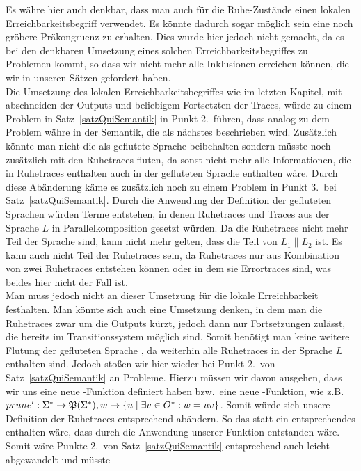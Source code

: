Es währe hier auch denkbar, dass man auch für die Ruhe-Zustände einen lokalen
Erreichbarkeitsbegriff verwendet. Es könnte dadurch sogar möglich sein eine
noch gröbere Präkongruenz zu erhalten. Dies wurde hier jedoch nicht gemacht, da
es bei den denkbaren Umsetzung eines solchen Erreichbarkeitsbegriffes zu
Problemen kommt, so dass wir nicht mehr alle Inklusionen erreichen können, die
wir in unseren Sätzen gefordert haben.\\
Die Umsetzung des lokalen Erreichbarkeitsbegriffes wie im letzten Kapitel, mit
abschneiden der Outputs und beliebigem Fortsetzten der Traces, würde zu einem
Problem in Satz~\ref{satzQuiSemantik} in Punkt 2.\ führen, dass analog zu dem
Problem währe in der Semantik, die als nächstes beschrieben wird. Zusätzlich könnte
man nicht die \EL{} als geflutete Sprache beibehalten sondern müsste noch
zusätzlich mit den Ruhetraces fluten, da sonst nicht mehr alle
Informationen, die in Ruhetraces enthalten auch in der gefluteten Sprache
enthalten wäre. Durch diese Abänderung käme es zusätzlich noch zu einem Problem
in Punkt 3.\ bei Satz~\ref{satzQuiSemantik}. Durch die Anwendung der Definition
der gefluteten Sprachen würden Terme entstehen, in denen Ruhetraces und Traces
aus der Sprache $L$ in Parallelkomposition gesetzt würden. Da die Ruhetraces
nicht mehr Teil der Sprache sind, kann nicht mehr gelten, dass die Teil von
$L_1\|L_2$ ist. Es kann auch nicht Teil der Ruhetraces sein, da Ruhetraces nur
aus Kombination von zwei Ruhetraces entstehen können oder in dem sie
Errortraces sind, was beides hier nicht der Fall ist.\\
Man muss jedoch nicht an dieser Umsetzung für die lokale Erreichbarkeit
festhalten. Man könnte sich auch eine Umsetzung denken, in dem man die
Ruhetraces zwar um die Outputs kürzt, jedoch dann nur Fortsetzungen zulässt,
die bereits im Transitionssystem möglich sind. Somit benötigt man keine weitere
Flutung der gefluteten Sprache \EL{}, da weiterhin alle Ruhetraces in der
Sprache $L$ enthalten sind. Jedoch stoßen wir hier wieder bei Punkt 2.\ von
Satz~\ref{satzQuiSemantik} an Probleme. Hierzu müssen wir davon ausgehen, dass
wir uns eine neue \prune{}-Funktion definiert haben bzw.\ eine neue
\cont{}-Funktion, wie z.B. $prune'{}: \Sigma ^*\rightarrow
\mathfrak{P}(\Sigma ^*), w\mapsto \{u\mid \exists v\in O^*:w=uv\}$. Somit würde
sich unsere Definition der Ruhetraces entsprechend abändern. So das statt
\StQT{} ein entsprechendes \PrQT{} enthalten wäre, dass durch die Anwendung
unserer \prunenew{} Funktion entstanden wäre. Somit wäre Punkte 2.\ von
Satz~\ref{satzQuiSemantik} entsprechend auch leicht abgewandelt und müsste
